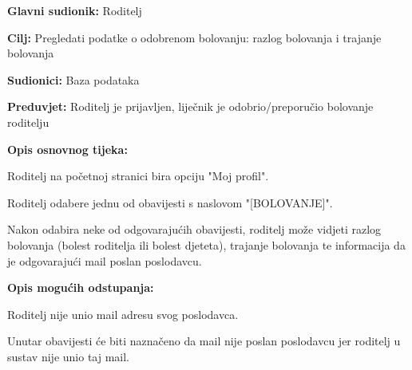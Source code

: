 					\noindent {}
					\begin{packed_item}
						
						\item \textbf{Glavni sudionik: }Roditelj
						\item  \textbf{Cilj:} Pregledati podatke o odobrenom bolovanju: razlog bolovanja i trajanje bolovanja
						\item  \textbf{Sudionici:} Baza podataka
						\item  \textbf{Preduvjet:} Roditelj je prijavljen, liječnik je odobrio/preporučio bolovanje roditelju
						\item  \textbf{Opis osnovnog tijeka:}
						
						\item[] \begin{packed_enum}
							
							\item Roditelj na početnoj stranici bira opciju "Moj profil".
							\item Roditelj odabere jednu od obavijesti s naslovom "[BOLOVANJE]".
							\item Nakon odabira neke od odgovarajućih obavijesti, roditelj može vidjeti razlog bolovanja (bolest roditelja ili bolest djeteta), trajanje bolovanja te informacija da je odgovarajući mail poslan poslodavcu.
						\end{packed_enum}
						
						\item  \textbf{Opis mogućih odstupanja:}
						
						\item[] \begin{packed_item}
							
							\item[3.a] Roditelj nije unio mail adresu svog poslodavca.
							\item[] \begin{packed_enum}
								
								\item Unutar obavijesti će biti naznačeno da mail nije poslan poslodavcu jer roditelj u sustav nije unio taj mail.
							\end{packed_enum}
							
							
						\end{packed_item}
					\end{packed_item}
					
